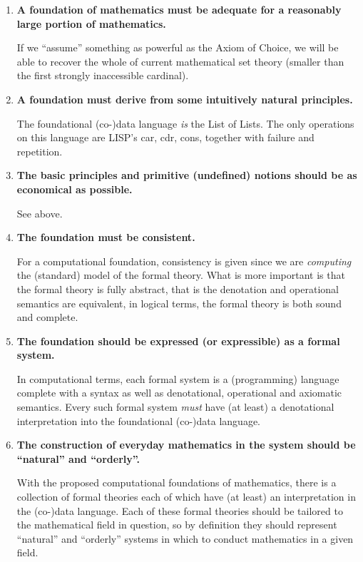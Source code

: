 \documentclass[a4paper,openany]{amsart}
\begin{document}
\begin{enumerate}
\item \textbf{A foundation of mathematics must be adequate for a reasonably large
portion of mathematics.}
	
\noindent If we ``assume'' something as powerful as the Axiom of Choice, we will
be able to recover the whole of current mathematical set theory (smaller than
the first strongly inaccessible cardinal).
	
\item \textbf{A foundation must derive from some intuitively natural principles.}
	
\noindent The foundational (co-)data language \emph{is} the List of Lists. The
only operations on this language are LISP's car, cdr, cons, together with
failure and repetition.
	
\item \textbf{The basic principles and primitive (undefined) notions should be
as economical as possible.}
	
\noindent See above.
	
\item \textbf{The foundation must be consistent.}
	
\noindent For a computational foundation, consistency is given since we are
\emph{computing} the (standard) model of the formal theory. What is more
important is that the formal theory is fully abstract, that is the denotation
and operational semantics are equivalent, in logical terms, the formal theory is
both sound and complete.
	
\item \textbf{The foundation should be expressed (or expressible) as a formal
system.}
	
\noindent In computational terms, each formal system is a (programming) language
complete with a syntax as well as denotational, operational and axiomatic
semantics. Every such formal system \emph{must} have (at least) a denotational
interpretation into the foundational (co-)data language.
	
\item \textbf{The construction of everyday mathematics in the system should be
``natural'' and ``orderly''.}
	
\noindent With the proposed computational foundations of mathematics, there is a
collection of formal theories each of which have (at least) an interpretation in
the (co-)data language. Each of these formal theories should be tailored to the
mathematical field in question, so by definition they should represent
``natural'' and ``orderly'' systems in which to conduct mathematics in a given
field.
	
\end{enumerate}
\end{document}
